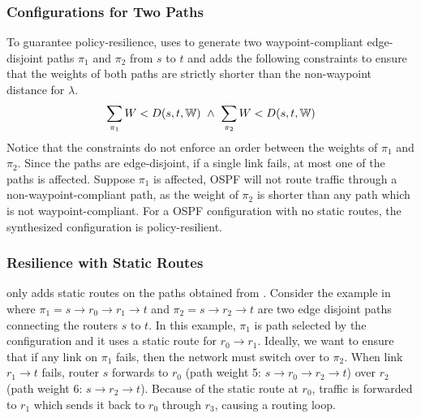 \subsubsection{Configurations for Two Paths} \label{sec:ospfresilience}
To guarantee policy-resilience, \name
uses \genesis to generate two waypoint-compliant 
edge-disjoint paths $\pi_1$ and $\pi_2$ from $s$ to $t$
and
adds the following constraints
 to ensure that the  weights 
of both paths are strictly shorter than 
the non-waypoint distance for $\lambda$. 
\begin{equation} \label{eq:resilience}
\sum_{\pi_1}W < D(s,t,\mathbb{W}) ~\wedge~ \sum_{\pi_2}W < D(s,t,\mathbb{W}) 
\end{equation}
Notice that the constraints do not enforce an order between the weights of $\pi_1$ and $\pi_2$.
Since the paths are edge-disjoint, if a single link fails, at most one 
of the paths is affected. Suppose
$\pi_1$ is affected, OSPF will not route traffic through a  
non-waypoint-compliant path, as the weight of $\pi_2$ is shorter 
than any path which is not waypoint-compliant. 
For a OSPF configuration with no static routes,
the synthesized configuration is policy-resilient. 



\subsubsection{Resilience with Static Routes}
\name only adds static routes on the paths obtained from \genesis.
Consider the example in  where 
$\pi_1=s\rightarrow r_0 \rightarrow r_1 \rightarrow t$ 
and $\pi_2=s\rightarrow r_2 \rightarrow t$ 
are two edge disjoint paths 
connecting the routers $s$ to $t$. In this example, 
$\pi_1$ is path selected by the configuration and it uses a static route
for $r_0 \rightarrow r_1$. 
Ideally, we want to ensure 
that if any link on $\pi_1$ fails, 
then the network must switch over to $\pi_2$. 
When link $r_1 \rightarrow t$ fails,
router $s$ forwards to $r_0$ (path weight 5: $ s \rightarrow r_0 \rightarrow r_2 \rightarrow t$)
over $r_2$ (path weight 6: $s \rightarrow r_2 \rightarrow t$). 
Because of the static route at $r_0$, traffic is forwarded
to $r_1$ which sends it back to $r_0$ through $r_3$, 
causing a routing loop. 


